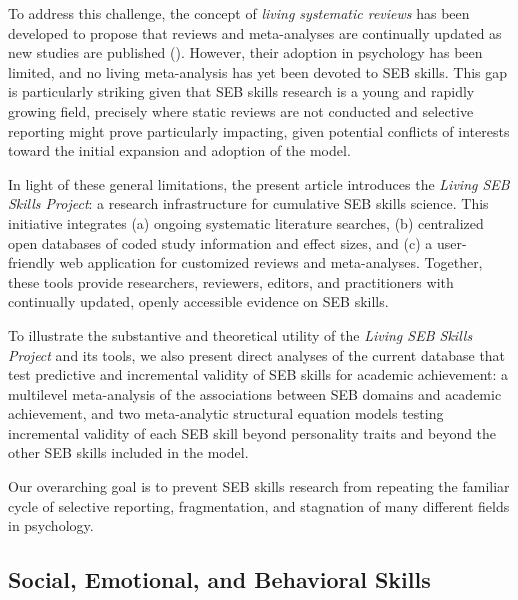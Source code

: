\documentclass[
  man,
  longtable,
  nolmodern,
  notxfonts,
  notimes,
  colorlinks=true,linkcolor=blue,citecolor=blue,urlcolor=blue]{apa7}
\begin{document}
To address this challenge, the concept of \emph{living systematic
reviews} has been developed to propose that reviews and meta-analyses
are continually updated as new studies are published
(). However, their adoption in psychology has been limited, and no
living meta-analysis has yet been devoted to SEB skills. This gap is
particularly striking given that SEB skills research is a young and
rapidly growing field, precisely where static reviews are not conducted
and selective reporting might prove particularly impacting, given
potential conflicts of interests toward the initial expansion and
adoption of the model.

In light of these general limitations, the present article introduces
the \emph{Living SEB Skills Project}: a research infrastructure for
cumulative SEB skills science. This initiative integrates (a) ongoing
systematic literature searches, (b) centralized open databases of coded
study information and effect sizes, and (c) a user-friendly web
application for customized reviews and meta-analyses. Together, these
tools provide researchers, reviewers, editors, and practitioners with
continually updated, openly accessible evidence on SEB skills.

To illustrate the substantive and theoretical utility of the
\emph{Living SEB Skills Project} and its tools, we also present direct
analyses of the current database that test predictive and incremental
validity of SEB skills for academic achievement: a multilevel
meta-analysis of the associations between SEB domains and academic
achievement, and two meta-analytic structural equation models testing
incremental validity of each SEB skill beyond personality traits and
beyond the other SEB skills included in the model.

Our overarching goal is to prevent SEB skills research from repeating
the familiar cycle of selective reporting, fragmentation, and stagnation
of many different fields in psychology.

\subsection{Social, Emotional, and Behavioral
Skills}\label{social-emotional-and-behavioral-skills}
\end{document}
